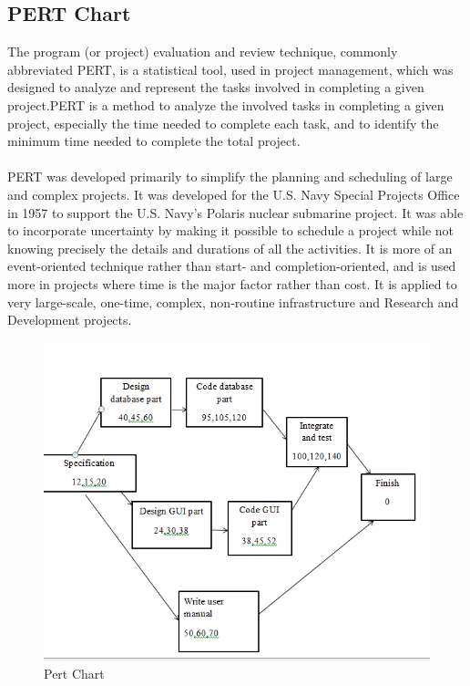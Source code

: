 \subsection{PERT Chart}
The program (or project) evaluation and review technique, commonly abbreviated PERT, is a statistical tool, used in project management, which was designed to analyze and represent the tasks involved in completing a given project.PERT is a method to analyze the involved tasks in completing a given project, especially the time needed to complete each task, and to identify the minimum time needed to complete the total project.\\\\
PERT was developed primarily to simplify the planning and scheduling of large and complex projects. It was developed for the U.S. Navy Special Projects Office in 1957 to support the U.S. Navy's Polaris nuclear submarine project. It was able to incorporate uncertainty by making it possible to schedule a project while not knowing precisely the details and durations of all the activities. It is more of an event-oriented technique rather than start- and completion-oriented, and is used more in projects where time is the major factor rather than cost. It is applied to very large-scale, one-time, complex, non-routine infrastructure and Research and Development projects.
\begin{figure}[!h]
\begin{center}
\includegraphics[scale=0.4]{images/pert.png}
\end{center}
\caption{Pert Chart}
\end{figure}

